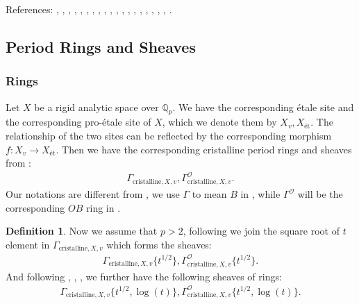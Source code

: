 \documentclass[12pt]{book}
\theoremstyle{definition}
\newtheorem{definition}{Definition}
\begin{document}
\noindent References: \cite{Sch1}, \cite{Sch2}, \cite{FS}, \cite{KL1}, \cite{KL2}, \cite{BL1}, \cite{BL2}, \cite{BS}, \cite{BHS}, \cite{Fon1}, \cite{CS1}, \cite{CS2}, \cite{BK}, \cite{BBK}, \cite{BBBK}, \cite{KKM}, \cite{KM}, \cite{LZ}, \cite{TT}, \cite{M}.


\subsection{Period Rings and Sheaves}


\subsubsection{Rings}

\noindent Let $X$ be a rigid analytic space over $\mathbb{Q}_p$. We have the corresponding \'etale site and the corresponding pro-\'etale site of $X$, which we denote them by $X_{v},X_\text{\'et}$. The relationship of the two sites can be reflected by the corresponding morphism $f:X_{v}\longrightarrow X_\text{\'et}$. Then we have the corresponding cristalline period rings and sheaves from \cite{TT}:
\begin{align}
\Gamma_{\text{cristalline},X,v}, \Gamma^\mathcal{O}_{\text{cristalline},X,v}.
\end{align}
Our notations are different from \cite{TT}, we use $\Gamma$ to mean $B$ in \cite{TT}, while $\Gamma^\mathcal{O}$ will be the corresponding $OB$ ring in \cite{TT}.\\

\begin{definition}
\indent Now we assume that $p>2$, following \cite{BS} we join the square root of $t$ element in $\Gamma_{\text{cristalline},X,v}$ which forms the sheaves:
\begin{align}
\Gamma_{\text{cristalline},X,v}\{t^{1/2}\},\Gamma^\mathcal{O}_{\text{cristalline},X,v}\{t^{1/2}\}.
\end{align}
And following \cite{BL1}, \cite{BL2}, \cite{Fon1}, \cite{BHS} we further have the following sheaves of rings:
\begin{align}
\Gamma_{\text{cristalline},X,v}\{t^{1/2},\log(t)\},\Gamma^\mathcal{O}_{\text{cristalline},X,v}\{t^{1/2},\log(t)\}.
\end{align}
\end{definition}
\end{document}
